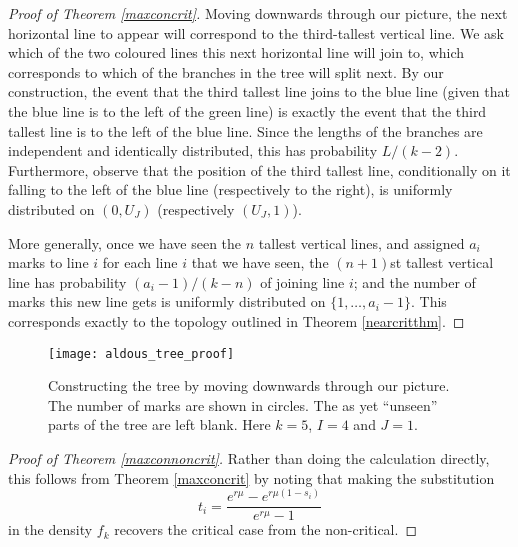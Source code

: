 \documentclass{article}
\theoremstyle{plain}
\theoremstyle{definition}
\begin{document}
\begin{proof}[Proof of Theorem \ref{maxconcrit}]
Moving downwards through our picture, the next horizontal line to appear will correspond to the third-tallest vertical line. We ask which of the two coloured lines this next horizontal line will join to, which corresponds to which of the branches in the tree will split next. By our construction, the event that the third tallest line joins to the blue line (given that the blue line is to the left of the green line) is exactly the event that the third tallest line is to the left of the blue line. Since the lengths of the branches are independent and identically distributed, this has probability $L/(k-2)$. Furthermore, observe that the position of the third tallest line, conditionally on it falling to the left of the blue line (respectively to the right), is uniformly distributed on $(0,U_J)$ (respectively $(U_J,1)$).

More generally, once we have seen the $n$ tallest vertical lines, and assigned $a_i$ marks to line $i$ for each line $i$ that we have seen, the $(n+1)$st tallest vertical line has probability $(a_i-1)/(k-n)$ of joining line $i$; and the number of marks this new line gets is uniformly distributed on $\{1,\ldots,a_i-1\}$. This corresponds exactly to the topology outlined in Theorem \ref{nearcritthm}.
\end{proof}

\begin{figure}[h!]
  \centering
   \texttt{[image: aldous\_tree\_proof]}
   \vspace{0mm}
  \caption{\small{Constructing the tree by moving downwards through our picture. The number of marks are shown in circles. The as yet ``unseen'' parts of the tree are left blank. Here $k=5$, $I=4$ and $J=1$.}}\label{aldProoffig}
  \end{figure}


\begin{proof}[Proof of Theorem \ref{maxconnoncrit}]
Rather than doing the calculation directly, this follows from Theorem \ref{maxconcrit} by noting that making the substitution
\[t_i = \frac{e^{r\mu}-e^{r\mu(1-s_i)}}{e^{r\mu}-1}\]
in the density $f_k$ recovers the critical case from the non-critical.
\end{proof}




\appendix

\section{}
\end{document}
